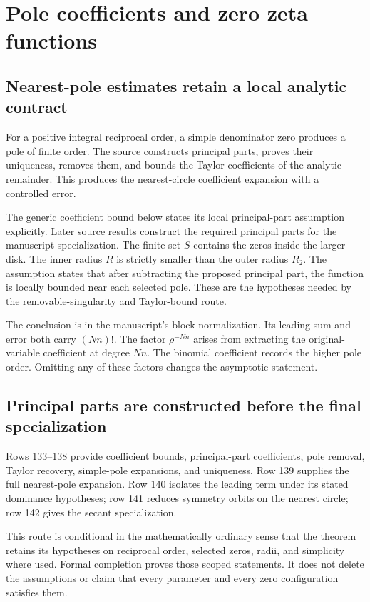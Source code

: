 \section{Pole coefficients and zero zeta functions}
\subsection{Nearest-pole estimates retain a local analytic contract}
For a positive integral reciprocal order, a simple denominator zero produces a pole of finite order. The source constructs principal parts, proves their uniqueness, removes them, and bounds the Taylor coefficients of the analytic remainder. This produces the nearest-circle coefficient expansion with a controlled error.

The generic coefficient bound below states its local principal-part assumption explicitly. Later source results construct the required principal parts for the manuscript specialization.
The finite set $S$ contains the zeros inside the larger disk. The inner radius $R$ is strictly smaller than the outer radius $R_2$. The assumption  states that after subtracting the proposed principal part, the function is locally bounded near each selected pole. These are the hypotheses needed by the removable-singularity and Taylor-bound route.

The conclusion is in the manuscript's block normalization. Its leading sum and error both carry $(Nn)!$. The factor $\rho^{-Nn}$ arises from extracting the original-variable coefficient at degree $Nn$. The binomial coefficient records the higher pole order. Omitting any of these factors changes the asymptotic statement.

\subsection{Principal parts are constructed before the final specialization}
Rows 133--138 provide coefficient bounds, principal-part coefficients, pole removal, Taylor recovery, simple-pole expansions, and uniqueness. Row 139 supplies the full nearest-pole expansion. Row 140 isolates the leading term under its stated dominance hypotheses; row 141 reduces symmetry orbits on the nearest circle; row 142 gives the secant specialization.

This route is conditional in the mathematically ordinary sense that the theorem retains its hypotheses on reciprocal order, selected zeros, radii, and simplicity where used. Formal completion proves those scoped statements. It does not delete the assumptions or claim that every parameter and every zero configuration satisfies them.

